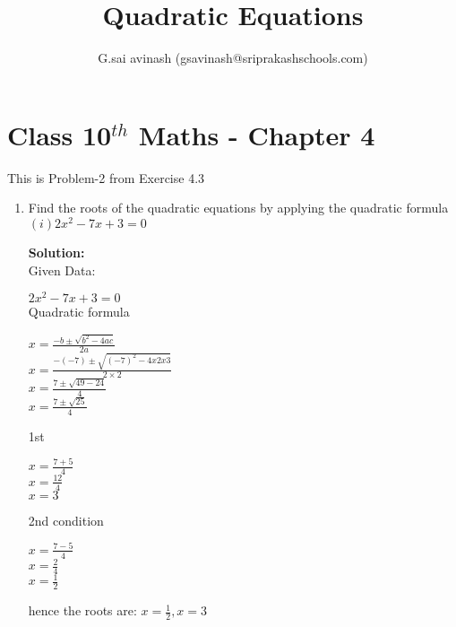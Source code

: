 \documentclass[12pt]{article}
\title{Quadratic Equations}
\author{G.sai avinash (gsavinash@sriprakashschools.com)}
\newcommand{\solution}{\noindent \textbf{Solution: }}
\begin{document}
\maketitle
\section*{Class 10$^{th}$ Maths - Chapter 4}
This is Problem-2 from Exercise 4.3
\begin{enumerate}
\item   Find the roots of the quadratic equations by applying the quadratic formula \\

${(i)2{x^2} - 7x + 3 = 0}$


\solution \\
Given Data:

${2x^2- 7x + 3 = 0}$\\
Quadratic formula\\

\begin{aligin}
$x=\frac{-b\pm\sqrt{b^2-4ac}}{2a}$\\
$x=\frac{-(-7)\pm\sqrt{(-7)^2-4x2x3 }}{2 \times 2}$\\
$x=\frac{7\pm\sqrt{49 - 24}}{4}$\\
$x=\frac{7\pm\sqrt{25}}{4}$\\
\end{aligin}


1st 

\begin{aligin}
$x=\frac{7+5}{4}$\\
$x=\frac{12}{4}$\\
$x=3$\\
\end{aligin}


2nd condition

\begin{aligin}
$x=\frac{7-5}{4}$\\
$x=\frac{2}{4}$\\
$x=\frac{1}{2}$\\
\end{aligin}



hence the roots are: ${x=\frac{1}{2}}{, x=3}$\\









\end{enumerate}
\end{document}
